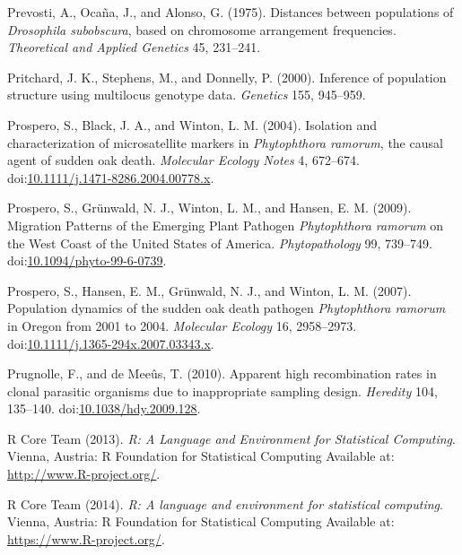 \documentclass[double,12pt]{beavtex}
\begin{document}
  \hypertarget{ref-prevosti1975distances}{}
  Prevosti, A., Ocaña, J., and Alonso, G. (1975). Distances between
  populations of \emph{Drosophila subobscura}, based on chromosome
  arrangement frequencies. \emph{Theoretical and Applied Genetics} 45,
  231--241.
  
  \hypertarget{ref-pritchard2000inference}{}
  Pritchard, J. K., Stephens, M., and Donnelly, P. (2000). Inference of
  population structure using multilocus genotype data. \emph{Genetics}
  155, 945--959.
  
  \hypertarget{ref-prospero2004isolation}{}
  Prospero, S., Black, J. A., and Winton, L. M. (2004). Isolation and
  characterization of microsatellite markers in \emph{Phytophthora
  ramorum}, the causal agent of sudden oak death. \emph{Molecular Ecology
  Notes} 4, 672--674.
  doi:\href{https://doi.org/10.1111/j.1471-8286.2004.00778.x}{10.1111/j.1471-8286.2004.00778.x}.
  
  \hypertarget{ref-prospero2009migration}{}
  Prospero, S., Grünwald, N. J., Winton, L. M., and Hansen, E. M. (2009).
  Migration Patterns of the Emerging Plant Pathogen \emph{Phytophthora
  ramorum} on the West Coast of the United States of America.
  \emph{Phytopathology} 99, 739--749.
  doi:\href{https://doi.org/10.1094/phyto-99-6-0739}{10.1094/phyto-99-6-0739}.
  
  \hypertarget{ref-prospero2007population}{}
  Prospero, S., Hansen, E. M., Grünwald, N. J., and Winton, L. M. (2007).
  Population dynamics of the sudden oak death pathogen \emph{Phytophthora
  ramorum} in Oregon from 2001 to 2004. \emph{Molecular Ecology} 16,
  2958--2973.
  doi:\href{https://doi.org/10.1111/j.1365-294x.2007.03343.x}{10.1111/j.1365-294x.2007.03343.x}.
  
  \hypertarget{ref-prugnolle2010apparent}{}
  Prugnolle, F., and de Meeûs, T. (2010). Apparent high recombination
  rates in clonal parasitic organisms due to inappropriate sampling
  design. \emph{Heredity} 104, 135--140.
  doi:\href{https://doi.org/10.1038/hdy.2009.128}{10.1038/hdy.2009.128}.
  
  \hypertarget{ref-R2013}{}
  R Core Team (2013). \emph{R: A Language and Environment for Statistical
  Computing}. Vienna, Austria: R Foundation for Statistical Computing
  Available at: \url{http://www.R-project.org/}.
  
  \hypertarget{ref-R2014}{}
  R Core Team (2014). \emph{R: A language and environment for statistical
  computing}. Vienna, Austria: R Foundation for Statistical Computing
  Available at: \url{https://www.R-project.org/}.
  
\end{document}
